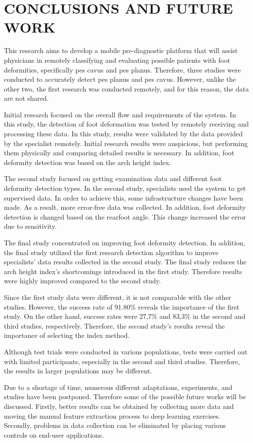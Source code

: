 \chapter{CONCLUSIONS AND FUTURE WORK}\label{chp:ConclusionsAndFutureWork}

This research aims to develop a mobile pre-diagnostic platform that will assist physicians in remotely classifying and evaluating possible patients with foot deformities, specifically pes cavus and pes planus. Therefore, three studies were conducted to accurately detect pes planus and pes cavus. However, unlike the other two, the first research was conducted remotely, and for this reason, the data are not shared.

Initial research focused on the overall flow and requirements of the system. In this study, the detection of foot deformation was tested by remotely receiving and processing these data. In this study, results were validated by the data provided by the specialist remotely. Initial research results were auspicious, but performing them physically and comparing detailed results is necessary. In addition, foot deformity detection was based on the arch height index. 

The second study focused on getting examination data and different foot deformity detection types. In the second study, specialists used the system to get supervised data. In order to achieve this, some infrastructure changes have been made. As a result, more error-free data was collected. In addition, foot deformity detection is changed based on the rearfoot angle. This change increased the error due to sensitivity.

The final study concentrated on improving foot deformity detection. In addition, the final study utilized the first research detection algorithm to improve specialists' data results collected in the second study. The final study reduces the arch height index's shortcomings introduced in the first study. Therefore results were highly improved compared to the second study. 

Since the first study data were different, it is not comparable with the other studies. However, the success rate of 91.80\% reveals the importance of the first study. On the other hand, success rates were 27,7\% and 83,3\% in the second and third studies, respectively. Therefore, the second study's results reveal the importance of selecting the index method.

Although test trials were conducted in various populations, tests were carried out with limited participants, especially in the second and third studies. 
Therefore, the results in larger populations may be different.

Due to a shortage of time, numerous different adaptations, experiments, and studies have been postponed. Therefore some of the possible future works will be discussed. Firstly, better results can be obtained by collecting more data and moving the manual feature extraction process to deep learning exercises. Secondly, problems in data collection can be eliminated by placing various controls on end-user applications.

